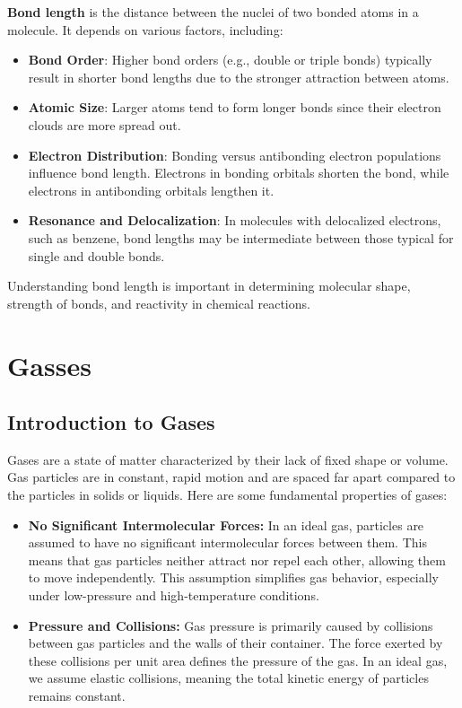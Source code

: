 \documentclass{report}
\begin{document}
\textbf{Bond length} is the distance between the nuclei of two bonded atoms in a molecule. It depends on various factors, including:

\begin{itemize}
	\item \textbf{Bond Order}: Higher bond orders (e.g., double or triple bonds) typically result in shorter bond lengths due to the stronger attraction between atoms.
	\item \textbf{Atomic Size}: Larger atoms tend to form longer bonds since their electron clouds are more spread out.
	\item \textbf{Electron Distribution}: Bonding versus antibonding electron populations influence bond length. Electrons in bonding orbitals shorten the bond, while electrons in antibonding orbitals lengthen it.
	\item \textbf{Resonance and Delocalization}: In molecules with delocalized electrons, such as benzene, bond lengths may be intermediate between those typical for single and double bonds.
\end{itemize}

Understanding bond length is important in determining molecular shape, strength of bonds, and reactivity in chemical reactions.

\chapter{Gasses}

\section{Introduction to Gases}
Gases are a state of matter characterized by their lack of fixed shape or volume. Gas particles are in constant, rapid motion and are spaced far apart compared to the particles in solids or liquids. Here are some fundamental properties of gases:

\begin{itemize}
	\item \textbf{No Significant Intermolecular Forces:} In an ideal gas, particles are assumed to have no significant intermolecular forces between them. This means that gas particles neither attract nor repel each other, allowing them to move independently. This assumption simplifies gas behavior, especially under low-pressure and high-temperature conditions.

	\item \textbf{Pressure and Collisions:} Gas pressure is primarily caused by collisions between gas particles and the walls of their container. The force exerted by these collisions per unit area defines the pressure of the gas. In an ideal gas, we assume elastic collisions, meaning the total kinetic energy of particles remains constant.
\end{itemize}
\end{document}
